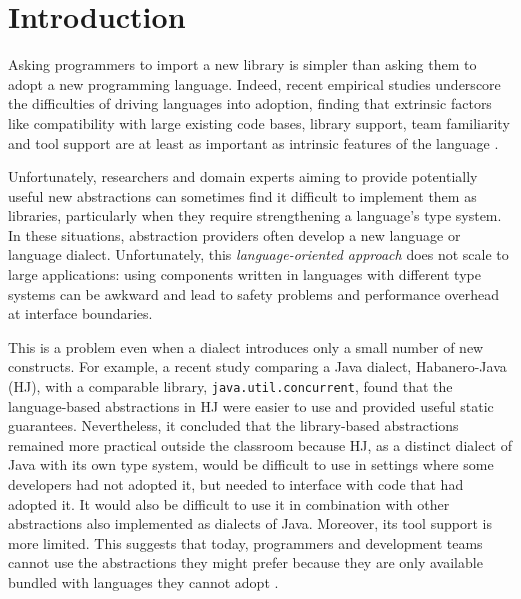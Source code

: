 \documentclass[10pt,preprint]{sigplanconf}
\begin{document}
\section{Introduction}\label{intro}
Asking programmers to import a new library is simpler than asking them to adopt a new programming language. Indeed, recent empirical studies underscore the difficulties of driving languages into adoption, finding that extrinsic factors like compatibility with large existing code bases,  library support, team familiarity and tool support are at least as important as intrinsic features of the language  \cite{Meyerovich:2013:EAP:2509136.2509515,chen05,nguyen2010survey}. 

Unfortunately, researchers and domain experts aiming to provide potentially useful new abstractions can sometimes find it difficult to implement them as libraries, particularly when they require strengthening a language's type system. In these situations, abstraction providers often develop a new language or language dialect. Unfortunately, this \emph{language-oriented approach} \cite{journals/stp/Ward94} does not scale to large applications: using  components written in languages with different type systems can be awkward and lead to safety problems and performance overhead at interface boundaries. %

This is a problem even when a dialect introduces only a small number of new constructs. For example, a recent  study \cite{cave2010comparing} comparing a Java dialect, Habanero-Java (HJ), with a comparable library, \verb|java.util.concurrent|, found that the language-based abstractions in HJ were easier to use and provided useful static guarantees. Nevertheless, it concluded that the library-based abstractions remained more practical outside the classroom because HJ, as a distinct dialect of Java with its own type system, would be difficult to use in settings where some developers had not adopted it, but needed to interface with code that had adopted it. It would also be difficult to use it in combination with other abstractions also implemented as dialects of Java. Moreover, its tool support is more limited. 
This suggests that today, programmers and development teams cannot use  the abstractions they might prefer because they are only available bundled with languages they cannot adopt \cite{Meyerovich:2012:SDR:2414721.2414724,Meyerovich:2013:EAP:2509136.2509515}. 
\end{document}
